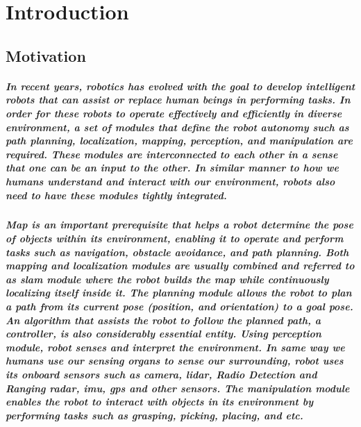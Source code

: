 \chapter{Introduction}
\label{ch:intro}

\section{Motivation}
\label{sec:background}
\paragraph{\textnormal{In recent years, robotics has evolved with the goal to develop intelligent robots that can assist or replace human beings in performing tasks. In order for these robots to operate effectively and efficiently  in diverse environment, a set of modules that define the robot autonomy such as path planning, localization, mapping, perception, and manipulation are required. These modules are interconnected to each other in a sense that one can be an input to the other. In similar manner to how we humans understand and interact with our environment, robots also need to have these modules tightly integrated.}}

\paragraph{\textnormal{Map is an important prerequisite that helps a robot determine the pose of objects within its environment, enabling it to operate and perform tasks such as navigation, obstacle avoidance, and path planning. Both mapping and localization modules are usually combined and referred to as \gls{slam} module where the robot builds the map while continuously localizing itself inside it.  The planning module allows the robot to plan a path from its current pose (position, and orientation) to a  goal pose. An algorithm that assists the robot to follow the planned path, a controller, is also considerably essential entity. Using perception module, robot senses and interpret the environment. In same way we humans use our sensing organs to sense our surrounding, robot uses its onboard sensors such as camera, \gls{lidar}, Radio Detection and Ranging \gls{radar}, \gls{imu}, \gls{gps} and other sensors. The manipulation module enables the robot to interact with objects in its environment by performing tasks such as grasping, picking, placing, and etc.}}

